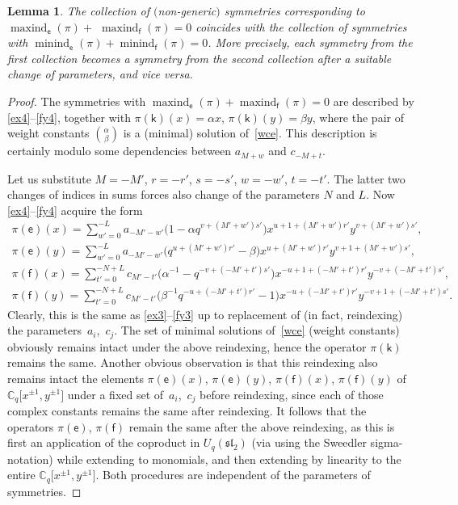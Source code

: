 \documentclass[pdftex]{sigma}
\numberwithin{equation}{section}
\newtheorem{Lemma}[Theorem]{Lemma}
\begin{document}
\begin{Lemma}\label{param_change}
The collection of $($non-generic$)$ symmetries corresponding to $\operatorname{maxind}_\mathsf{e}(\pi)+$ \linebreak $\operatorname{maxind}_\mathsf{f}(\pi)=0$ coincides with the collection of symmetries with $\operatorname{minind}_\mathsf{e}(\pi)+\operatorname{minind}_\mathsf{f}(\pi)=0$. More precisely, each symmetry from the first collection becomes a symmetry from the second collection after a suitable change of parameters, and vice versa.
\end{Lemma}

\begin{proof} The symmetries with $\operatorname{maxind}_\mathsf{e}(\pi)+ \operatorname{maxind}_\mathsf{f}(\pi)=0$ are described by \eqref{ex4}--\eqref{fy4}, together with $\pi(\mathsf{k})(x)=\alpha x$, $\pi(\mathsf{k})(y)=\beta y$, where the pair of weight constants $\binom{\alpha}{\beta}$ is a (minimal) solution of~\eqref{wce}. This description is certainly modulo some dependencies between $a_{M+w}$ and $c_{-M+t}$.

Let us substitute $M=-M'$, $r=-r'$, $s=-s'$, $w=-w'$, $t=-t'$. The latter two changes of indices in sums forces also change of the parameters $N$ and $L$. Now \eqref{ex4}--\eqref{fy4} acquire the form
\begin{gather*}
\pi(\mathsf{e})(x) =\sum_{w'=0}^{-L}a_{-M'-w'}\big(1-\alpha q^{v+(M'+w')s'}\big)x^{u+1+(M'+w')r'}y^{v+(M'+w')s'},\\
\pi(\mathsf{e})(y) =\sum_{w'=0}^{-L}a_{-M'-w'}\big(q^{u+(M'+w')r'}-\beta\big)x^{u+(M'+w')r'}y^{v+1+(M'+w')s'},\\
\pi(\mathsf{f})(x) =\sum_{t'=0}^{-N+L}c_{M'-t'}\big(\alpha^{-1}-q^{-v+(-M'+t')s'}\big)x^{-u+1+(-M'+t')r'}y^{-v+(-M'+t')s'},\\
\pi(\mathsf{f})(y) =\sum_{t'=0}^{-N+L}c_{M'-t'}\big(\beta^{-1}q^{-u+(-M'+t')r'}-1\big)x^{-u+(-M'+t')r'}y^{-v+1+(-M'+t')s'}.
\end{gather*}
Clearly, this is the same as \eqref{ex3}--\eqref{fy3} up to replacement of (in fact, reindexing) the parame\-ters~$a_i$,~$c_j$. The set of minimal solutions of~\eqref{wce} (weight constants) obviously remains intact under the above reindexing, hence the operator $\pi(\mathsf{k})$ remains the same. Another obvious observation is that this reindexing also remains intact the elements $\pi(\mathsf{e})(x)$, $\pi(\mathsf{e})(y)$, $\pi(\mathsf{f})(x)$, $\pi(\mathsf{f})(y)$ of $\mathbb{C}_q\big[x^{\pm 1},y^{\pm 1}\big]$ under a fixed set of~$a_i$,~$c_j$ before reindexing, since each of those complex constants remains the same after reindexing. It follows that the operators $\pi(\mathsf{e})$, $\pi(\mathsf{f})$ remain the same after the above reindexing, as this is first an application of the coproduct in $U_q(\mathfrak{sl}_2)$ (via using the Sweedler sigma-notation) while extending to monomials, and then extending by linearity to the entire $\mathbb{C}_q\big[x^{\pm 1},y^{\pm 1}\big]$. Both procedures are independent of the parameters of symmetries.


\end{proof}
\end{document}
